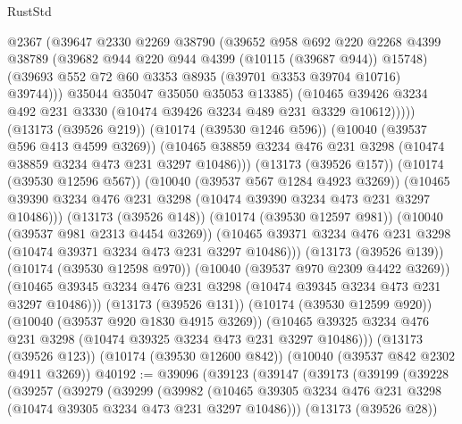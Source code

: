 \begin{lexlean}{RustStd}
\begin{coremodule}
                      @2367
                      (@39647
                        @2330
                        @2269
                        @38790
                        (@39652
                          @958
                          @692
                          @220
                          @2268
                          @4399
                          @38789
                          (@39682 @944 @220 @944 @4399 (@10115 (@39687 @944)) @15748)
                          (@39693 @552 @72 @60 @3353 @8935 (@39701 @3353 @39704 @10716) @39744)))
                      @35044
                      @35047
                      @35050
                      @35053
                      @13385)
                    (@10465
                      @39426
                      @3234
                      @492
                      @231
                      @3330
                      (@10474 @39426 @3234 @489 @231 @3329 @10612)))))
              (@13173 (@39526 @219))
              (@10174 (@39530 @1246 @596))
              (@10040 (@39537 @596 @413 @4599 @3269))
              (@10465 @38859 @3234 @476 @231 @3298 (@10474 @38859 @3234 @473 @231 @3297 @10486)))
            (@13173 (@39526 @157))
            (@10174 (@39530 @12596 @567))
            (@10040 (@39537 @567 @1284 @4923 @3269))
            (@10465 @39390 @3234 @476 @231 @3298 (@10474 @39390 @3234 @473 @231 @3297 @10486)))
          (@13173 (@39526 @148))
          (@10174 (@39530 @12597 @981))
          (@10040 (@39537 @981 @2313 @4454 @3269))
          (@10465 @39371 @3234 @476 @231 @3298 (@10474 @39371 @3234 @473 @231 @3297 @10486)))
        (@13173 (@39526 @139))
        (@10174 (@39530 @12598 @970))
        (@10040 (@39537 @970 @2309 @4422 @3269))
        (@10465 @39345 @3234 @476 @231 @3298 (@10474 @39345 @3234 @473 @231 @3297 @10486)))
      (@13173 (@39526 @131))
      (@10174 (@39530 @12599 @920))
      (@10040 (@39537 @920 @1830 @4915 @3269))
      (@10465 @39325 @3234 @476 @231 @3298 (@10474 @39325 @3234 @473 @231 @3297 @10486)))
    (@13173 (@39526 @123))
    (@10174 (@39530 @12600 @842))
    (@10040 (@39537 @842 @2302 @4911 @3269))
@40192 := @39096
    (@39123
      (@39147
        (@39173
          (@39199
            (@39228
              (@39257
                (@39279
                  (@39299
                    (@39982
                      (@10465
                        @39305
                        @3234
                        @476
                        @231
                        @3298
                        (@10474 @39305 @3234 @473 @231 @3297 @10486)))
                    (@13173 (@39526 @28))

\end{coremodule}
\end{lexlean}
